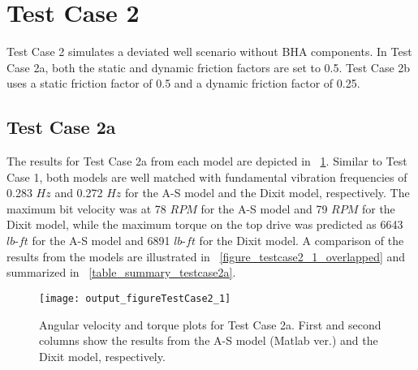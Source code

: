 \section{Test Case 2}
Test Case 2 simulates a deviated well scenario without BHA components. In Test Case 2a, both the static and dynamic friction factors are set to 0.5. Test Case 2b uses a static friction factor of 0.5 and a dynamic friction factor of 0.25.

\subsection{Test Case 2a}
The results for Test Case 2a from each model are depicted in \figurename~\ref{figure_testcase2_1}. Similar to Test Case 1, both models are well matched with fundamental vibration frequencies of 0.283 $Hz$ and 0.272 $Hz$ for the A-S model and the Dixit model, respectively. The maximum bit velocity was at 78 $RPM$ for the A-S model and 79 $RPM$ for the Dixit model, while the maximum torque on the top drive was predicted as 6643 $lb\mbox{-}ft$ for the A-S model and 6891 $lb\mbox{-}ft$ for the Dixit model. A comparison of the results from the models are illustrated in \figurename~\ref{figure_testcase2_1_overlapped} and summarized in \tablename~\ref{table_summary_testcase2a}.
\begin{figure}
  \centering
  \texttt{[image: output\_figureTestCase2\_1]}
  \caption[Angular velocity and torque plots for Test Case 2a]{Angular velocity and torque plots for Test Case 2a. First and second columns show the results from the A-S model (Matlab ver.) and the Dixit model, respectively.}\label{figure_testcase2_1}
\end{figure}

